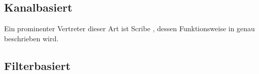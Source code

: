 \cite{Liu2003Survey}

\subsection{Kanalbasiert}
\label{chap:grundlagen:pubsub:kanalbasiert}
Ein prominenter Vertreter dieser Art ist Scribe \cite{Castro2002Scribe}, dessen Funktionsweise in  genau beschrieben wird.

\subsection{Filterbasiert}
\label{chap:grundlagen:pubsub:filterbased}
\cite{Bharambe2004Mercury} %

\cite{Demers2006Towards} %

\cite{Huebsch2003ContentBased}


